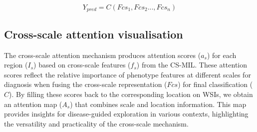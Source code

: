 \documentclass[times,twocolumn,final]{elsarticle}
\begin{document}
\begin{equation}
    Y_{pred} = C(Fcs_1,Fcs_2...,Fcs_n) 
\label{eq:prediction}
\end{equation}










\subsection{Cross-scale attention visualisation}

The cross-scale attention mechanism produces attention scores ($a_s$) for each region ($I_s$) based on cross-scale features ($f_s$) from the CS-MIL. These attention scores reflect the relative importance of phenotype features at different scales for diagnosis when fusing the cross-scale representation ($Fcs$) for final classification ($C$). By filling these scores back to the corresponding location on WSIs, we obtain an attention map ($A_s$) that combines scale and location information. This map provides insights for disease-guided exploration in various contexts, highlighting the versatility and practicality of the cross-scale mechanism.
\end{document}
